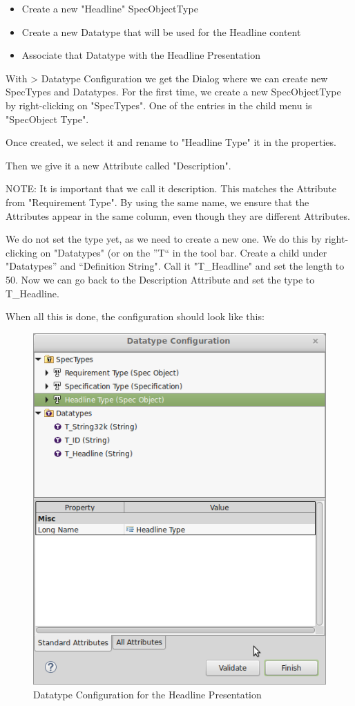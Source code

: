\begin{itemize}

\item
  Create a new "Headline" SpecObjectType
\item
  Create a new Datatype that will be used for the Headline content
\item
  Associate that Datatype with the Headline Presentation
\end{itemize}

With \pror{} \textgreater{} Datatype Configuration we get the Dialog where
we can create new SpecTypes and Datatypes.  For the first time, we create
a new SpecObjectType by right-clicking on "SpecTypes".  One of the
entries in the child menu is "SpecObject Type".

Once created, we select it and rename to "Headline Type" it in the
properties.

Then we give it a new Attribute called "Description".

NOTE: It is important that we call it description.  This matches the
Attribute from "Requirement Type".  By using the same name, we ensure
that the Attributes appear in the same column, even though they are
different Attributes.

We do not set the type yet, as we need to create a new one.  We do this
by right-clicking on "Datatypes" (or on the ''T`` in the tool bar.  Create a child under "Datatypes'' and  ``Definition String". Call it "T\_Headline" and set the length to 50.  Now we can go back to the Description Attribute and set the type to T\_Headline.

When all this is done, the configuration should look like this:

\begin{figure}[h!]
\centering      
\includegraphics[width=0.8\linewidth]{../rmf-images/datatype_Headline_desc.png}      
\caption{Datatype Configuration for the Headline Presentation}      
\label{fig:headlineConfig}
\end{figure}

